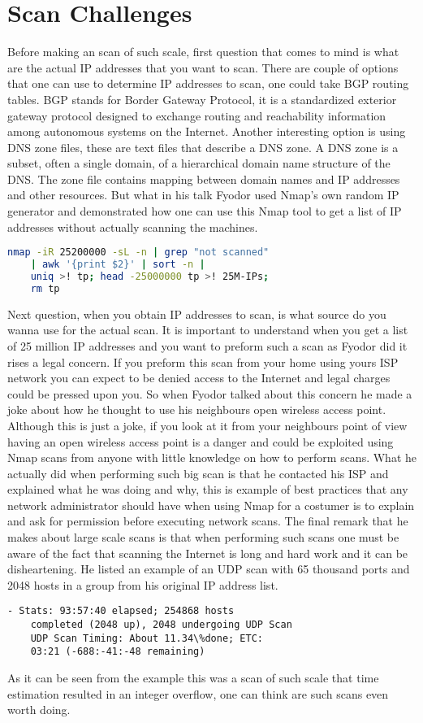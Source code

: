 \documentclass[times, utf8, seminar,english]{fer}
\begin{document}
\section{Scan Challenges}
Before making an scan of such scale, first question that comes to mind is what are the actual IP addresses that you want to scan. There are couple of options that one can use to determine IP addresses to scan, one could take BGP routing tables. BGP stands for Border Gateway Protocol, it is a standardized exterior gateway protocol designed to exchange routing and reachability information among autonomous systems on the Internet. Another interesting option is using DNS zone files, these are text files that describe a DNS zone. A DNS zone is a subset, often a single domain, of a hierarchical domain name structure of the DNS. The zone file contains mapping between domain names and IP addresses and other resources. But what in his talk Fyodor used Nmap's own random IP generator and demonstrated how one can use this Nmap tool to get a list of IP addresses without actually scanning the machines.
\begin{lstlisting}[language=bash, caption= Using Nmap to generate random IP addresses]
	nmap -iR 25200000 -sL -n | grep "not scanned" 
	| awk '{print $2}' | sort -n |
	uniq >! tp; head -25000000 tp >! 25M-IPs;
	rm tp
\end{lstlisting}
Next question, when you obtain IP addresses to scan, is what source do you wanna use for the actual scan. It is important to understand when you get a list of 25 million IP addresses and you want to preform such a scan as Fyodor did it rises a legal concern. If you preform this scan from your home using yours ISP network you can expect to be denied access to the Internet and legal charges could be pressed upon you. So when Fyodor talked about this concern he made a joke about how he thought to use his neighbours open wireless access point. Although this is just a joke, if you look at it from your neighbours point of view having an open wireless access point is a danger and could be exploited using Nmap scans from anyone with little knowledge on how to perform scans. What he actually did when performing such big scan is that he contacted his ISP and explained what he was doing and why, this is example of best practices that any network administrator should have when using Nmap for a costumer is to explain and ask for permission before executing network scans. The final remark that he makes about large scale scans is that when performing such scans one must be aware of the fact that scanning the Internet is long and hard work and it can be disheartening. He listed an example of an UDP scan with 65 thousand ports and 2048 hosts in a group from his original IP address list.
\begin{lstlisting}[caption=UDP Scan performance example]
	- Stats: 93:57:40 elapsed; 254868 hosts
	completed (2048 up), 2048 undergoing UDP Scan
	UDP Scan Timing: About 11.34\%done; ETC:
	03:21 (-688:-41:-48 remaining)
\end{lstlisting}
As it can be seen from the example this was a scan of such scale that time estimation resulted in an integer overflow, one can think are such scans even worth doing.
\end{document}
